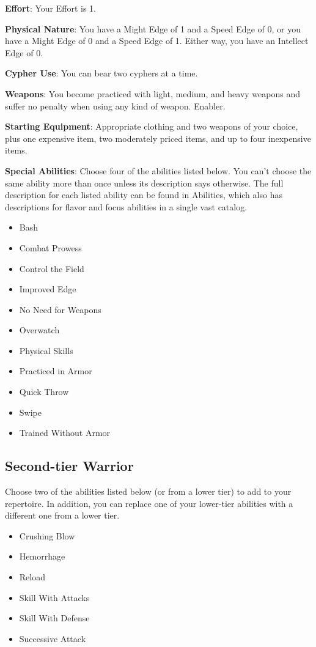 \textbf{Effort}: Your Effort is 1.

\textbf{Physical Nature}: You have a Might Edge of 1 and a Speed Edge of 0, or you have a Might Edge of 0 and a Speed Edge of 1. Either way, you have an Intellect Edge of 0.

\textbf{Cypher Use}: You can bear two cyphers at a time.

\textbf{Weapons}: You become practiced with light, medium, and heavy weapons and suffer no penalty when using any kind of weapon. Enabler.

\textbf{Starting Equipment}: Appropriate clothing and two weapons of your choice, plus one expensive item, two moderately priced items, and up to four inexpensive items.

\textbf{Special Abilities}: Choose four of the abilities listed below. You can’t choose the same ability more than once unless its description says otherwise. The full description for each listed ability can be found in Abilities, which also has descriptions for flavor and focus abilities in a single vast catalog.

\begin{itemize}
\item Bash
\item Combat Prowess
\item Control the Field
\item Improved Edge
\item No Need for Weapons
\item Overwatch
\item Physical Skills
\item Practiced in Armor
\item Quick Throw
\item Swipe
\item Trained Without Armor
\end{itemize}

\subsection{Second-tier Warrior}

Choose two of the abilities listed below (or from a lower tier) to add to your repertoire. In addition, you can replace one of your lower-tier abilities with a different one from a lower tier.

\begin{itemize}
\item Crushing Blow
\item Hemorrhage
\item Reload
\item Skill With Attacks
\item Skill With Defense
\item Successive Attack
\end{itemize}


